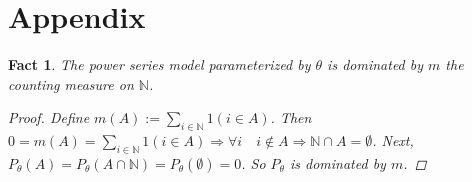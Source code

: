 \documentclass[11 pt]{article}
\newtheorem*{ass*}{Assumption}
\newtheorem{fact}{Fact}
\newtheorem{lem}{Lemma}
\newtheorem{defn}{Definition} %
\renewcommand{\th}{\theta}
\newcommand{\boldXnt}{\mbox{\boldmath $X_{n,T_n}$}}
\begin{document}



\section{Appendix}

\begin{fact} 
\label{fact:dom}
The power series model parameterized by $\th$ is dominated by $m$ the counting measure on $\mathbb{N}$.
\begin{proof}
Define $m(A) := \sum_{i \in \mathbb{N}} 1(i \in A)$. Then $0=m(A)=\sum_{i \in \mathbb{N}} 1(i \in A) \Rightarrow \forall i \quad i \not \in A \Rightarrow \mathbb{N} \cap A = \emptyset$. Next, $P_{\th} (A) = P_{\th} (A \cap \mathbb{N}) = P_{\th} (\emptyset) = 0$. So $P_{\th}$ is dominated by $m$.
\end{proof}
\end{fact}





\end{document}
